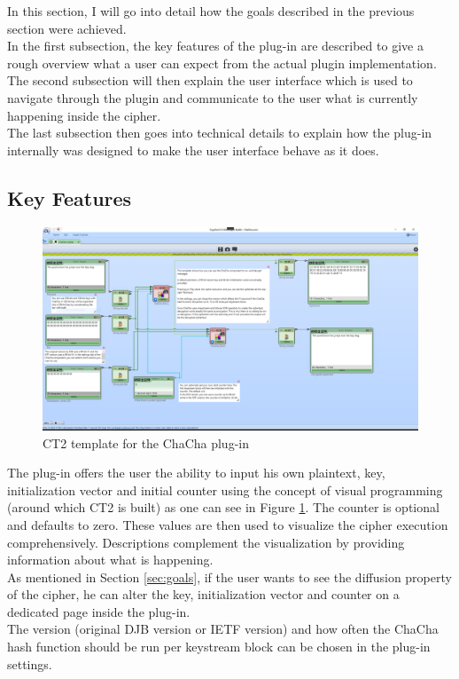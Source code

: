 In this section, I will go into detail how the goals described in the previous section were achieved. \\
In the first subsection, the key features of the plug-in are described to give a rough overview what a user can expect from the actual plugin implementation. \\
The second subsection will then explain the user interface which is used to navigate through the plugin and communicate to the user what is currently happening inside the cipher. \\
The last subsection then goes into technical details to explain how the plug-in internally was designed to make the user interface behave as it does.


\subsection{Key Features}
\label{sec:keyFeatures}

\begin{figure}
\centering
\includegraphics[width=\textwidth]{figures/ct2/plugin-template.png}
\caption[ChaCha CT2 template]{CT2 template for the ChaCha plug-in}
\label{fig:plugin.template}
\end{figure}

The plug-in offers the user the ability to input his own plaintext, key, initialization vector and initial counter using the concept of visual programming (around which CT2 is built) as one can see in Figure \ref{fig:plugin.template}. The counter is optional and defaults to zero. These values are then used to visualize the cipher execution comprehensively. Descriptions complement the visualization by providing information about what is happening. \\
As mentioned in Section \ref{sec:goals}, if the user wants to see the diffusion property of the cipher, he can alter the key, initialization vector and counter on a dedicated page inside the plug-in. \\
The version (original DJB version or IETF version) and how often the ChaCha hash function should be run per keystream block can be chosen in the plug-in settings.

